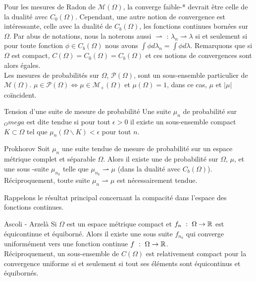 \documentclass[a4paper,12pt]{article}
\renewcommand{\lstlistingname}{Code}%
\renewcommand{\lstlistlistingname}{Liste des \lstlistingname s}%
\begin{document}
\begin{appendices}
Pour les mesures de Radon de $\mathcal{M}(\Omega)$, la converge faible-* devrait être celle de la dualité avec $C_0(\Omega)$. Cependant, une autre notion de convergence est intéressante, celle avec la dualité de $C_b(\Omega)$, les fonctions continues bornées sur $\Omega$. Par abus de notations, nous la noterons aussi $\rightharpoonup$ : $\lambda_n\rightharpoonup\lambda$ si et seulement si pour toute fonction $\phi\in C_b(\Omega)$ nous avons $\int \phi d\lambda_n=\int \phi d\lambda$. Remarquons que si $\Omega$ est compact, $C(\Omega)=C_0(\Omega)=C_b(\Omega)$ et ces notions de convergences sont alors égales. \\

Les mesures de probabilités sur $\Omega$, $\mathcal{P}(\Omega)$, sont un sous-ensemble particulier de $\mathcal{M}(\Omega)$. $\mu\in\mathcal{P}(\Omega) \Leftrightarrow \mu \in\mathcal{M}_+(\Omega)$ et $\mu(\Omega) = 1$, dans ce cas, $\mu$ et $|\mu |$ coïncident. 
\begin{definition}{Tension d'une suite de mesure de probabilité}
Une suite $\mu_n$ de probabilité sur $_Omega$ est dite tendue si pour tout $\epsilon>0$ il existe un sous-ensemble compact $K\subset\Omega$ tel que $\mu_n(\Omega\backslash K) <\epsilon$ pour tout $n$. 
\end{definition}
\begin{theoreme}{Prokhorov}
\label{thm:prokhorov}
Soit $\mu_n$ une suite tendue de mesure de probabilité sur un espace métrique complet et séparable $\Omega$. Alors il existe une de probabilité sur $\Omega$, $\mu$, et une sous -suite $\mu_{n_k}$ telle que $\mu_{n_k} \rightharpoonup \mu$ (dans la dualité avec $C_b(\Omega)$). \\
Réciproquement, toute suite $\mu_n\rightharpoonup \mu$ est nécessairement tendue.  
\end{theoreme}

Rappelons le résultat principal concernant la compacité dans l'espace des fonctions continues. 
\begin{theoreme}{Ascoli - Arzelà}
\label{thm:ascoli}
Si $\Omega$ est un espace métrique compact et $f_n\ :\ \Omega\rightarrow\RR$ est équicontinue et équiborné. Alors il existe une sous suite $f_{n_k}$ qui converge uniformément vers une fonction continue $f\ :\ \Omega\rightarrow\mathbb{R}$. \\
Réciproquement, un sous-ensemble de $C(\Omega)$ est relativement compact pour la convergence uniforme si et seulement si tout ses éléments sont équicontinus et équibornés.
\end{theoreme}











\end{appendices}


\newpage
{}
\listoffigures
\addcontentsline{toc}{section}{\lstlistlistingname}
\lstlistoflistings
\end{document}
